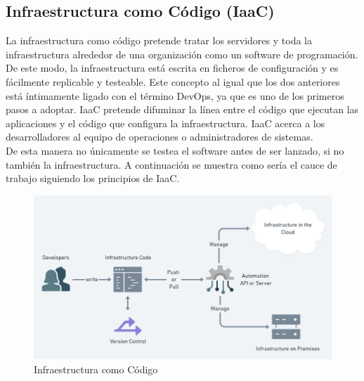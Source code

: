 	\subsection{Infraestructura como Código (IaaC)}
		\begin{text}
			La infraestructura como código pretende tratar los servidores y toda la infraestructura alrededor de una organización como un software de programación. De este modo, la infraestructura está escrita en ficheros de configuración y es fácilmente replicable y testeable. Este concepto al igual que los dos anteriores está íntimamente ligado con el término DevOps, ya que es uno de los primeros pasos a adoptar. IaaC pretende difuminar la línea entre el código que ejecutan las aplicaciones y el código que configura la infraestructura. IaaC acerca a los desarrolladores al equipo de operaciones o administradores de sistemas. \\
			De esta manera no únicamente se testea el software antes de ser lanzado, si no también la infraestructura. A continuación se muestra como sería el cauce de trabajo siguiendo los principios de IaaC.
			
			\begin{figure}[!hbt]
				\centering
				\includegraphics[scale=0.45]{imagenes/Introduccion/Conceptos_Basicos/IaaC.png}
				\caption[Infraestructura como Código]{Infraestructura como Código \cite{WhatIsIaaC:online}}
				\label{infraestructura_como_codigo} 
			\end{figure}
		\end{text}
	
